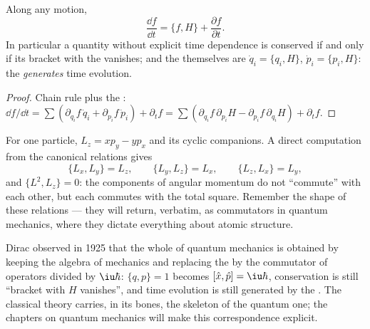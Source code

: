 \begin{theorem}\label{thm:b3:hamiltonian-mechanics:evolution}
Along any motion,
\[
\frac{\dd f}{\dd t} = \{f, H\} + \frac{\partial f}{\partial t} .
\]
In particular a quantity without explicit time dependence is conserved
if and only if its bracket with the  vanishes; and the
 themselves are $\dot q_i = \{q_i, H\}$, $\dot p_i
= \{p_i, H\}$: the  \emph{generates} time evolution.
\end{theorem}

\begin{proof}
Chain rule plus the : $\dd f/\dd t = \sum(
\partial_{q_i}f\,\dot q_i + \partial_{p_i}f\,\dot p_i) + \partial_tf =
\sum(\partial_{q_i}f\,\partial_{p_i}H - \partial_{p_i}f\,
\partial_{q_i}H) + \partial_tf$.
\end{proof}

\begin{example}\label{ex:b3:hamiltonian-mechanics:brackets}
For one particle, $L_z = xp_y - yp_x$ and its cyclic companions. A
direct computation from the canonical relations gives
\[
\{L_x, L_y\} = L_z , \qquad
\{L_y, L_z\} = L_x , \qquad
\{L_z, L_x\} = L_y ,
\]
and $\{L^2, L_z\} = 0$: the components of angular momentum do not
``commute'' with each other, but each commutes with the total square.
Remember the shape of these relations --- they will return, verbatim,
as commutators in quantum mechanics, where they dictate everything
about atomic structure.
\end{example}

\begin{remark}\label{rem:b3:hamiltonian-mechanics:doorway}
Dirac observed in 1925 that the whole of quantum mechanics is obtained
by keeping the algebra of  mechanics and replacing the
 by the commutator of operators divided by
$\iu\hbar$: $\{q, p\} = 1$ becomes $[\hat x, \hat p] = \iu\hbar$,
conservation is still ``bracket with $H$ vanishes'', and time
evolution is still generated by the . The classical theory
carries, in its bones, the skeleton of the quantum one; the chapters
on quantum mechanics will make this correspondence explicit.
\end{remark}

